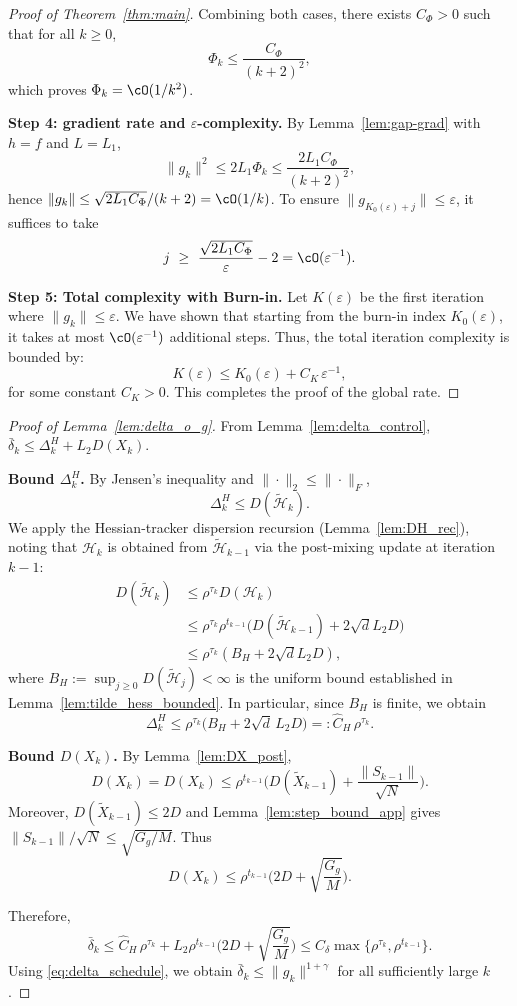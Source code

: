\documentclass[review,onefignum,onetabnum]{siamart171218}
\begin{document}
\begin{proof}[Proof of Theorem~\ref{thm:main}]
Combining both cases, there exists $C_\Phi>0$ such that for all $k\ge 0$,
\[
\Phi_k\le \frac{C_\Phi}{(k+2)^2},
\]
which proves $\Phi_k=\cO(1/k^2)$.

\smallskip
\noindent\textbf{Step 4: gradient rate and $\varepsilon$-complexity.}
By Lemma~\ref{lem:gap-grad} with $h=f$ and $L=L_1$,
\[
\|g_k\|^2\le 2L_1\Phi_k\le \frac{2L_1 C_\Phi}{(k+2)^2},
\]
hence $\|g_k\|\le \sqrt{2L_1 C_\Phi}/(k+2)=\cO(1/k)$.
To ensure $\|g_{K_0(\varepsilon)+j}\|\le \varepsilon$, it suffices to take
\[
j\ \ge\ \frac{\sqrt{2L_1 C_\Phi}}{\varepsilon}-2
=\cO(\varepsilon^{-1}).
\]

\smallskip
\noindent\textbf{Step 5: Total complexity with Burn-in.}
Let $K(\varepsilon)$ be the first iteration where $\|g_k\|\le \varepsilon$. We have shown that starting from the burn-in index $K_0(\varepsilon)$, it takes at most $\cO(\varepsilon^{-1})$ additional steps. Thus, the total iteration complexity is bounded by:
\[
K(\varepsilon)\le K_0(\varepsilon)+C_K\,\varepsilon^{-1},
\]
for some constant $C_K>0$. This completes the proof of the global rate.
\end{proof}

\begin{proof}[Proof of Lemma~\ref{lem:delta_o_g}]
From Lemma~\ref{lem:delta_control}, $\bar\delta_k\le \Delta_k^H+L_2D(X_k)$.

\smallskip
\noindent\textbf{Bound $\Delta_k^H$.}
By Jensen's inequality and $\|\cdot\|_2\le \|\cdot\|_F$,
\[
\Delta_k^H\le D(\tilde{\mathcal H}_k).
\]
We apply the Hessian-tracker dispersion recursion (Lemma~\ref{lem:DH_rec}),
noting that $\mathcal H_k$ is obtained from $\tilde{\mathcal H}_{k-1}$
via the post-mixing update at iteration $k{-}1$:
\begin{align*}
D(\tilde{\mathcal H}_k)
&\le \rho^{\tau_k}D(\mathcal H_k)\\
&\le \rho^{\tau_k}\rho^{t_{k-1}}\bigl(D(\tilde{\mathcal H}_{k-1})
\!+\!2\sqrt{d}L_2D\bigr)\\
&\le \rho^{\tau_k}(B_H\!+\!2\sqrt{d}L_2D),
\end{align*}
where $B_H:=\sup_{j\ge 0}D(\tilde{\mathcal H}_j)<\infty$ is the uniform bound
established in Lemma~\ref{lem:tilde_hess_bounded}.
In particular, since $B_H$ is finite, we obtain
\[
\Delta_k^H\le \rho^{\tau_k}\big(B_H+2\sqrt{d}\,L_2D\big)
=:\hat C_H\,\rho^{\tau_k}.
\]

\smallskip
\noindent\textbf{Bound $D(X_k)$.}
By Lemma~\ref{lem:DX_post},
\[
D(X_k)=D(X_k)\le \rho^{t_{k-1}}\Big(D(\tilde X_{k-1})+\frac{\|S_{k-1}\|}{\sqrt N}\Big).
\]
Moreover, $D(\tilde X_{k-1})\le 2D$ and Lemma~\ref{lem:step_bound_app} gives $\|S_{k-1}\|/\sqrt N\le \sqrt{G_g/M}$.
Thus
\[
D(X_k)\le \rho^{t_{k-1}}\Big(2D+\sqrt{\frac{G_g}{M}}\Big).
\]

\smallskip
Therefore,
\[
\bar\delta_k\le \hat C_H\,\rho^{\tau_k}
+L_2\rho^{t_{k-1}}\Big(2D+\sqrt{\frac{G_g}{M}}\Big)
\le C_\delta\max\{\rho^{\tau_k},\rho^{t_{k-1}}\}.
\]
Using \eqref{eq:delta_schedule}, we obtain $\bar\delta_k\le \|g_k\|^{1+\gamma}$ for all sufficiently large $k$.
\end{proof}
\end{document}
